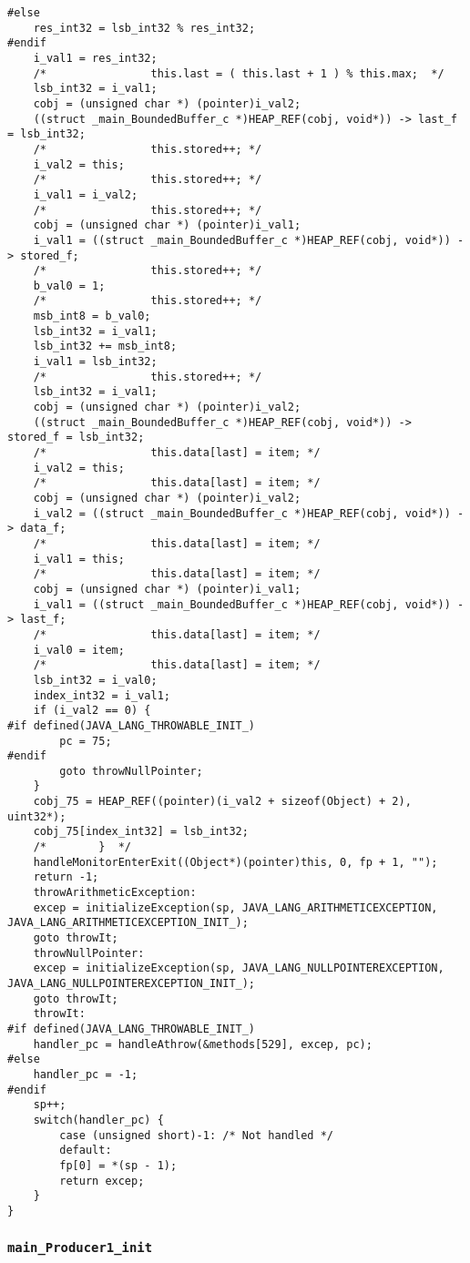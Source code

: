 \begin{lstlisting}[firstnumber=55202]
#else
	res_int32 = lsb_int32 % res_int32;
#endif
	i_val1 = res_int32;
	/*                this.last = ( this.last + 1 ) % this.max;  */
	lsb_int32 = i_val1;
	cobj = (unsigned char *) (pointer)i_val2;
	((struct _main_BoundedBuffer_c *)HEAP_REF(cobj, void*)) -> last_f = lsb_int32;
	/*                this.stored++; */
	i_val2 = this;
	/*                this.stored++; */
	i_val1 = i_val2;
	/*                this.stored++; */
	cobj = (unsigned char *) (pointer)i_val1;
	i_val1 = ((struct _main_BoundedBuffer_c *)HEAP_REF(cobj, void*)) -> stored_f;
	/*                this.stored++; */
	b_val0 = 1;
	/*                this.stored++; */
	msb_int8 = b_val0;
	lsb_int32 = i_val1;
	lsb_int32 += msb_int8;
	i_val1 = lsb_int32;
	/*                this.stored++; */
	lsb_int32 = i_val1;
	cobj = (unsigned char *) (pointer)i_val2;
	((struct _main_BoundedBuffer_c *)HEAP_REF(cobj, void*)) -> stored_f = lsb_int32;
	/*                this.data[last] = item; */
	i_val2 = this;
	/*                this.data[last] = item; */
	cobj = (unsigned char *) (pointer)i_val2;
	i_val2 = ((struct _main_BoundedBuffer_c *)HEAP_REF(cobj, void*)) -> data_f;
	/*                this.data[last] = item; */
	i_val1 = this;
	/*                this.data[last] = item; */
	cobj = (unsigned char *) (pointer)i_val1;
	i_val1 = ((struct _main_BoundedBuffer_c *)HEAP_REF(cobj, void*)) -> last_f;
	/*                this.data[last] = item; */
	i_val0 = item;
	/*                this.data[last] = item; */
	lsb_int32 = i_val0;
	index_int32 = i_val1;
	if (i_val2 == 0) {
#if defined(JAVA_LANG_THROWABLE_INIT_)
		pc = 75;
#endif
		goto throwNullPointer;
	}
	cobj_75 = HEAP_REF((pointer)(i_val2 + sizeof(Object) + 2), uint32*);
	cobj_75[index_int32] = lsb_int32;
	/*        }	 */
	handleMonitorEnterExit((Object*)(pointer)this, 0, fp + 1, "");
	return -1;
	throwArithmeticException:
	excep = initializeException(sp, JAVA_LANG_ARITHMETICEXCEPTION, JAVA_LANG_ARITHMETICEXCEPTION_INIT_);
	goto throwIt;
	throwNullPointer:
	excep = initializeException(sp, JAVA_LANG_NULLPOINTEREXCEPTION, JAVA_LANG_NULLPOINTEREXCEPTION_INIT_);
	goto throwIt;
	throwIt:
#if defined(JAVA_LANG_THROWABLE_INIT_)
	handler_pc = handleAthrow(&methods[529], excep, pc);
#else
	handler_pc = -1;
#endif
	sp++;
	switch(handler_pc) {
		case (unsigned short)-1: /* Not handled */
		default:
		fp[0] = *(sp - 1);
		return excep;
	}
}
\end{lstlisting}

\subsubsection{\texttt{main\_Producer1\_init}}

